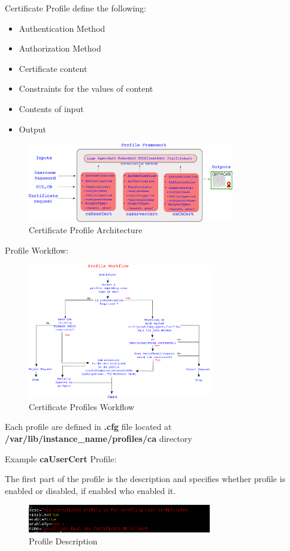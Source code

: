 \documentclass[12pt]{report}
\begin{document}
\begin{itemize}
            Certificate Profile define the following:
            \begin{itemize}
                \item  Authentication Method
                \item  Authorization Method
                \item  Certificate content
                \item  Constraints for the values of content
                \item  Contents of input
                \item  Output
            \end{itemize}
            \begin{figure}[ht!]
                \centering
                \includegraphics[width=90mm]{Images/CA-profiles-arch.png}
                \caption{Certificate Profile Architecture}
            \end{figure}
            Profile Workflow:
            \begin{figure}[ht!]
                \centering
                \includegraphics[width=80mm]{Images/CA-Profiles-workflow.png}
                \caption{Certificate Profiles Workflow}
            \end{figure}
            
            Each profile are defined in \textbf{.cfg} file located at \textbf{/var/lib/instance\_name/profiles/ca} directory

            Example \textbf{caUserCert} Profile:

            The first part of the profile is the description and specifies whether profile is enabled or disabled, if enabled who
            enabled it. 
            \begin{figure}[ht!]
                \centering
                \includegraphics[width=80mm]{Images/profile-1.png}
                \caption{Profile Description}
            \end{figure}
            

\end{itemize}
\end{document}
